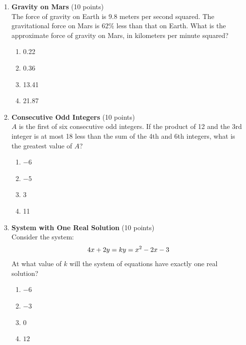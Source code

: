 \begin{enumerate}
  \newpage

  \item \textbf{Gravity on Mars} (10 points)\\
  The force of gravity on Earth is 9.8 meters per second squared. The gravitational force on Mars is $62\%$ less than that on Earth. What is the approximate force of gravity on Mars, in kilometers per minute squared?
  \begin{enumerate}[label=(\Alph*)]
    \item 0.22
    \item 0.36
    \item 13.41
    \item 21.87
  \end{enumerate}
  \begin{subanswer}
  \end{subanswer}

  \item \textbf{Consecutive Odd Integers} (10 points)\\
  $A$ is the first of six consecutive odd integers. If the product of 12 and the 3rd integer is at most 18 less than the sum of the 4th and 6th integers, what is the greatest value of $A$?
  \begin{enumerate}[label=(\Alph*)]
    \item $-6$
    \item $-5$
    \item 3
    \item 11
  \end{enumerate}
  \begin{subanswer}
  \end{subanswer}



  \item \textbf{System with One Real Solution} (10 points)\\
  Consider the system:
  \[
    4x + 2y = k \\
    y = x^2 - 2x - 3
  \]
  At what value of $k$ will the system of equations have exactly one real solution?
  \begin{enumerate}[label=(\Alph*)]
    \item $-6$
    \item $-3$
    \item $0$
    \item $12$
  \end{enumerate}
  \begin{subanswer}
  \end{subanswer}



\end{enumerate}
